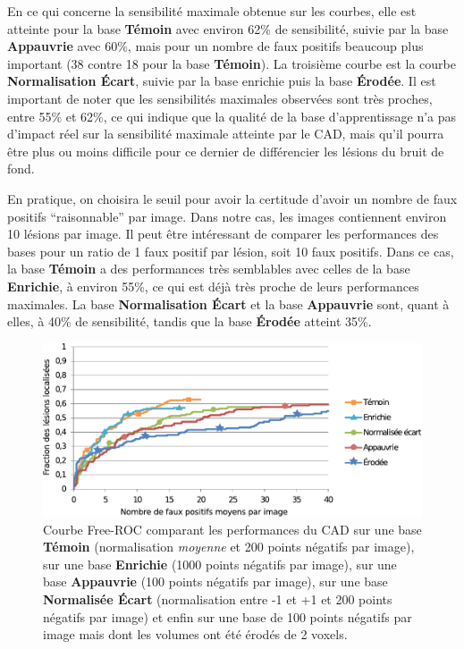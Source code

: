 En ce qui concerne la sensibilité maximale obtenue sur les courbes, elle est atteinte pour la base \textbf{Témoin} avec environ 62\% de sensibilité, suivie par la base \textbf{Appauvrie} avec 60\%, mais pour un nombre de faux positifs beaucoup plus important (38 contre 18 pour la base \textbf{Témoin}). La troisième courbe est la courbe \textbf{Normalisation Écart}, suivie par la base enrichie puis la base \textbf{Érodée}. Il est important de noter que les sensibilités maximales observées sont très proches, entre 55\% et 62\%, ce qui indique que la qualité de la base d'apprentissage n'a pas d'impact réel sur la sensibilité maximale atteinte par le CAD, mais qu'il pourra être plus ou moins difficile pour ce dernier de différencier les lésions du bruit de fond. 

En pratique, on choisira le seuil pour avoir la certitude d'avoir un nombre de faux positifs ``raisonnable'' par image. Dans notre cas, les images contiennent environ 10 lésions par image. Il peut être intéressant de comparer les performances des bases pour un ratio de 1 faux positif par lésion, soit 10 faux positifs. Dans ce cas, la base \textbf{Témoin} a des performances très semblables avec celles de la base \textbf{Enrichie}, à environ 55\%, ce qui est déjà très proche de leurs performances maximales. La base \textbf{Normalisation Écart} et la base \textbf{Appauvrie} sont, quant à elles, à 40\% de sensibilité, tandis que la base \textbf{Érodée} atteint 35\%.


\begin{figure}[h!]
 
 \begin{center}
   \includegraphics[width=15cm]{images/FROC_param_corrige}
 \end{center}
 \caption[Courbe Free-ROC comparant les performances du CAD selon les différents paramètres de base d'apprentissage]{Courbe Free-ROC comparant les performances du CAD sur une base \textbf{Témoin} (normalisation \emph{moyenne} et 200 points négatifs par image), sur une base \textbf{Enrichie} (1000 points négatifs par image), sur une base \textbf{Appauvrie} (100 points négatifs par image), sur une base \textbf{Normalisée Écart} (normalisation entre -1 et +1 et 200 points négatifs par image) et enfin sur une base de 100 points négatifs par image mais dont les volumes ont été érodés de 2 voxels.}
 \label{lab:froc_comp_static}
\end{figure}


